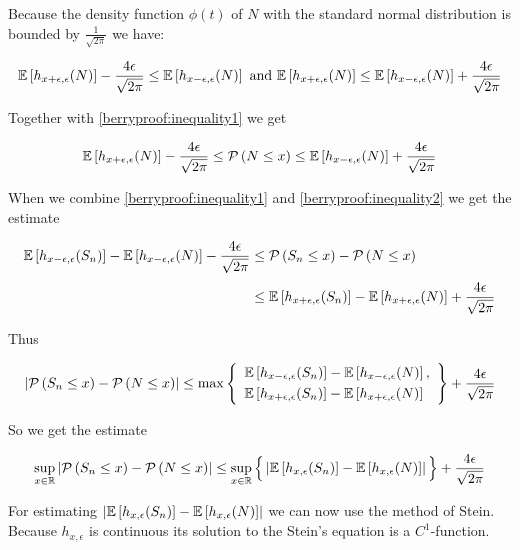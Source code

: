 Because the density function $\phi(t)$ of $N$ with the standard normal distribution is bounded by $\tfrac{1}{\sqrt{2\pi}}$ we have:

\begin{align}
  \mathbb E\left[{h_{x+\epsilon,\epsilon}(N)}\right]-\frac{4\epsilon}{\sqrt{2\pi}} \le \mathbb E\left[{h_{x-\epsilon,\epsilon}(N)}\right] \text{ and } \mathbb E\left[{h_{x+\epsilon,\epsilon}(N)}\right] \le \mathbb E\left[{h_{x-\epsilon,\epsilon}(N)}\right] + \frac{4\epsilon}{\sqrt{2\pi}}
\end{align}

\noindent Together with \eqref{berryproof:inequality1} we get

\begin{align} \label{berryproof:inequality2}
  \mathbb E\left[{h_{x+\epsilon,\epsilon}(N)}\right]-\frac{4\epsilon}{\sqrt{2\pi}} \le \mathcal P\left({N\le x}\right) \le \mathbb E\left[{h_{x-\epsilon,\epsilon}(N)}\right] + \frac{4\epsilon}{\sqrt{2\pi}}
\end{align}

\noindent When we combine \eqref{berryproof:inequality1} and \eqref{berryproof:inequality2} we get the estimate

\begin{align}
  \E{h_{x-\epsilon,\epsilon}(S_n)} - \E{h_{x-\epsilon,\epsilon}(N)} - \frac{4\epsilon}{\sqrt{2\pi}} & \le \P{S_n \le x} - \P{N \le x} \nl
  &\le \E{h_{x+\epsilon,\epsilon}(S_n)} - \E{h_{x+\epsilon,\epsilon}(N)} + \frac{4\epsilon}{\sqrt{2\pi}}
\end{align}

\noindent Thus

\begin{align}
  \abs{\P{S_n \le x}-\P{N \le x}} \le \max\left\{
    \begin{array}{l}
      \E{h_{x-\epsilon,\epsilon}(S_n)} - \E{h_{x-\epsilon,\epsilon}(N)}, \nl
      \E{h_{x+\epsilon,\epsilon}(S_n)} - \E{h_{x+\epsilon,\epsilon}(N)}
    \end{array}
  \right\} + \frac{4\epsilon}{\sqrt{2\pi}}
\end{align}

\noindent So we get the estimate

\begin{align}
  \sup_{x\in\mathbb R} \left|{\mathcal P\left({S_n \le x}\right) - \mathcal P\left({N \le x}\right)}\right| \le \sup_{x\in\mathbb R} \Big\{ \left|{\mathbb E\left[{h_{x,\epsilon}(S_n)}\right] - \mathbb E\left[{h_{x,\epsilon}(N)}\right]}\right| \Big\} + \frac{4\epsilon}{\sqrt{2\pi}}
\end{align}

For estimating $\left|{\mathbb E\left[{h_{x,\epsilon}(S_n)}\right] - \mathbb E\left[{h_{x,\epsilon}(N)}\right]}\right|$ we can now use the method of Stein. Because $h_{x,\epsilon}$ is continuous its solution to the Stein's equation is a $C^1$-function.

